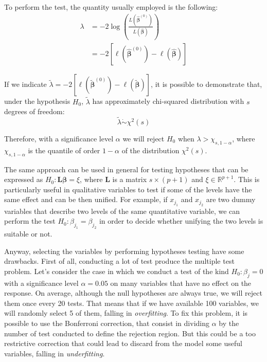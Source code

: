 \documentclass[a4paper, nobind]{templates/ociamthesis}
\theoremstyle{definition}
\theoremstyle{definition}
\theoremstyle{definition}
\theoremstyle{remark}
\begin{document}
To perform the test, the quantity usually employed is the following:
\begin{align*}
\lambda & = -2 \log{\left( \frac{L\left(\hat{\boldsymbol{\beta}}^{(0)}\right)}{L\left(\hat{\boldsymbol{\beta}}\right)} \right)} \\
& = -2 \left[ \ell\left(\hat{\boldsymbol{\beta}}^{(0)}\right) - \ell\left(\hat{\boldsymbol{\beta}}\right) \right]
\end{align*}

If we indicate \(\tilde{\lambda} = -2 \left[ \ell\left(\tilde{\boldsymbol{\beta}}^{(0)}\right) - \ell\left(\tilde{\boldsymbol{\beta}}\right) \right]\), it is possible to demonstrate that, under the hypothesis \(H_0\), \(\tilde{\lambda}\) has approximately chi-squared distribution with \(s\) degrees of freedom:
\[
\tilde{\lambda} \dot\sim \chi^2(s)
\]

Therefore, with a significance level \(\alpha\) we will reject \(H_0\) when \(\lambda > \chi_{s, 1-\alpha}\), where \(\chi_{s, 1-\alpha}\) is the quantile of order \(1-\alpha\) of the distribution \(\chi^2(s)\).

The same approach can be used in general for testing hypotheses that can be expressed as \(H_0: \boldsymbol{L}\boldsymbol{\beta} = \xi\), where \(\boldsymbol{L}\) is a matrix \(s\times(p+1)\) and \(\xi\in\mathbb{R}^{p+1}\). This is particularly useful in qualitative variables to test if some of the levels have the same effect and can be then unified. For example, if \(x_{j_1}\) and \(x_{j_2}\) are two dummy variables that describe two levels of the same quantitative variable, we can perform the test \(H_0: \beta_{j_1} = \beta_{j_2}\) in order to decide whether unifying the two levels is suitable or not.

Anyway, selecting the variables by performing hypotheses testing have some drawbacks. First of all, conducting a lot of test produce the multiple test problem. Let's consider the case in which we conduct a test of the kind \(H_0: \beta_j = 0\) with a significance level \(\alpha=0.05\) on many variables that have no effect on the response. On average, although the null hypotheses are always true, we will reject them once every 20 tests. That means that if we have available 100 variables, we will randomly select 5 of them, falling in \emph{overfitting}. To fix this problem, it is possible to use the Bonferroni correction, that consist in dividing \(\alpha\) by the number of test conducted to define the rejection region. But this could be a too restrictive correction that could lead to discard from the model some useful variables, falling in \emph{underfitting}.
\end{document}
